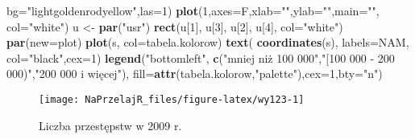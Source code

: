 \documentclass[polish,]{book}
\newenvironment{Shaded}{\begin{snugshade}}{\end{snugshade}}
\newcommand{\DataTypeTok}[1]{\textcolor[rgb]{0.13,0.29,0.53}{#1}}
\newcommand{\DecValTok}[1]{\textcolor[rgb]{0.00,0.00,0.81}{#1}}
\newcommand{\KeywordTok}[1]{\textcolor[rgb]{0.13,0.29,0.53}{\textbf{#1}}}
\newcommand{\NormalTok}[1]{#1}
\newcommand{\StringTok}[1]{\textcolor[rgb]{0.31,0.60,0.02}{#1}}
\begin{document}
\begin{Shaded}
\begin{Highlighting}[]
    \DataTypeTok{bg=}\StringTok{"lightgoldenrodyellow"}\NormalTok{,}\DataTypeTok{las=}\DecValTok{1}\NormalTok{)}
\KeywordTok{plot}\NormalTok{(}\DecValTok{1}\NormalTok{,}\DataTypeTok{axes=}\NormalTok{F,}\DataTypeTok{xlab=}\StringTok{""}\NormalTok{,}\DataTypeTok{ylab=}\StringTok{""}\NormalTok{,}\DataTypeTok{main=}\StringTok{""}\NormalTok{, }\DataTypeTok{col=}\StringTok{"white"}\NormalTok{)}
\NormalTok{u <-}\StringTok{ }\KeywordTok{par}\NormalTok{(}\StringTok{"usr"}\NormalTok{)}
\KeywordTok{rect}\NormalTok{(u[}\DecValTok{1}\NormalTok{], u[}\DecValTok{3}\NormalTok{], u[}\DecValTok{2}\NormalTok{], u[}\DecValTok{4}\NormalTok{], }\DataTypeTok{col=}\StringTok{"white"}\NormalTok{)}
\KeywordTok{par}\NormalTok{(}\DataTypeTok{new=}\NormalTok{plot)}
\KeywordTok{plot}\NormalTok{(s, }\DataTypeTok{col=}\NormalTok{tabela.kolorow)}
\KeywordTok{text}\NormalTok{( }\KeywordTok{coordinates}\NormalTok{(s), }\DataTypeTok{labels=}\NormalTok{NAM, }\DataTypeTok{col=}\StringTok{"black"}\NormalTok{,}\DataTypeTok{cex=}\DecValTok{1}\NormalTok{)}
\KeywordTok{legend}\NormalTok{(}\StringTok{"bottomleft"}\NormalTok{,}
       \KeywordTok{c}\NormalTok{(}\StringTok{"mniej niż 100 000"}\NormalTok{,}\StringTok{"[100 000 - 200 000)"}\NormalTok{,}\StringTok{"200 000 i więcej"}\NormalTok{),}
       \DataTypeTok{fill=}\KeywordTok{attr}\NormalTok{(tabela.kolorow,}\StringTok{"palette"}\NormalTok{),}\DataTypeTok{cex=}\DecValTok{1}\NormalTok{,}\DataTypeTok{bty=}\StringTok{"n"}\NormalTok{)}
\end{Highlighting}
\end{Shaded}

\begin{figure}[h]

{\centering \texttt{[image: NaPrzelajR\_files/figure-latex/wy123-1]} 

}

\caption{Liczba przestępstw w 2009 r.}\label{fig:wy123}
\end{figure}
\end{document}
